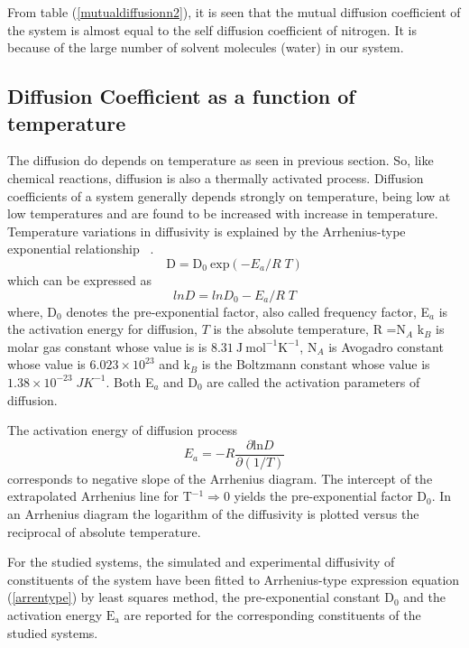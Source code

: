  From table (\ref{mutualdiffusionn2}), it is seen that the mutual diffusion coefficient of the system is almost equal to the self diffusion coefficient of nitrogen. It is because of the large number of solvent molecules (water)  in our system.
 
\subsection{Diffusion Coefficient as a function of temperature }
The diffusion do depends on temperature as seen in previous section. So, like chemical
reactions, diffusion is also a thermally activated process. Diffusion coefficients of a system generally depends strongly on temperature, being low at low temperatures and are found to be increased with increase in temperature. Temperature variations in diffusivity is explained by the  Arrhenius-type exponential relationship~ \citep{mehrer2007}.
\begin{equation} \label{Arrhenius_equation}
\mathrm{D}= \mathrm{D}_0~\mathrm{exp}\left(-E_a/R \; T\right)
\end{equation}
which can be expressed as 
\begin{equation}
ln D = ln D_0 - E_a/R\;T
\label{arrentype}
\end{equation}
where, D$_0$ denotes the pre-exponential factor, also called frequency factor, E$_a$ is the activation energy for diffusion, $T$ is the absolute temperature, R =N$_A$ k$_B$ is molar gas constant whose value is is $8.31~ \mathrm{J ~{mol}^{-1} K^{-1}}$, N$_A$ is Avogadro constant whose value is $6.023 \times 10^{23}$ and k$_B$ is the Boltzmann constant whose value
is $1.38 \times 10^{-23}\; J K^{-1}$. Both E$_a$ and D$_0$ are called the activation parameters of diffusion.

The activation energy of diffusion process ~\citep{mehrer2007}
\begin{equation}
E_a = -R \frac{\partial\mathrm {ln}D}{\partial (1/T)}
\end{equation}
corresponds to negative slope of the Arrhenius diagram. The intercept of the extrapolated Arrhenius line for T$^{\mathrm{-1}} \Longrightarrow 0 $ yields the pre-exponential factor D$_\mathrm{0}$. In an Arrhenius diagram the logarithm of the diffusivity is plotted versus the reciprocal of absolute temperature. 

For the studied systems, the simulated and experimental diffusivity of constituents of the system  have been fitted to Arrhenius-type expression equation (\ref{arrentype}) by least
squares method, the pre-exponential constant $\mathrm{D_0}$ and the activation energy $\mathrm{E_a}$ are reported for the corresponding constituents of the studied systems.

